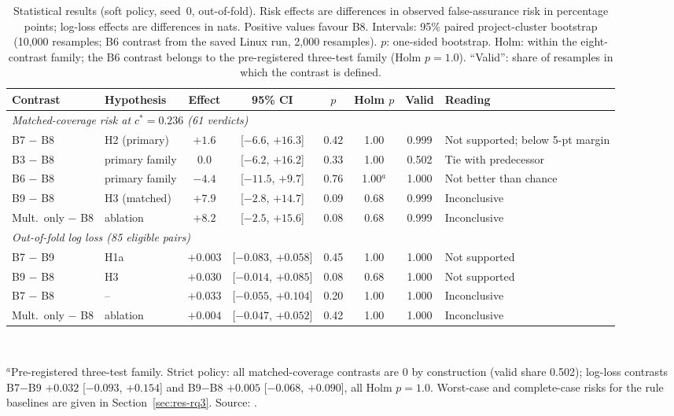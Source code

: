 \begin{table}[!t]
\caption{Statistical results (soft policy, seed~0, out-of-fold). Risk effects are differences in observed false-assurance risk in percentage points; log-loss effects are differences in nats. Positive values favour B8. Intervals: 95\% paired project-cluster bootstrap (10{,}000 resamples; B6 contrast from the saved Linux run, 2{,}000 resamples). $p$: one-sided bootstrap. Holm: within the eight-contrast family; the B6 contrast belongs to the pre-registered three-test family (Holm $p=1.0$). ``Valid'': share of resamples in which the contrast is defined.}
\label{tab:stats}
\centering
\footnotesize
\setlength{\tabcolsep}{4pt}
\begin{tabular}{|l|l|c|c|c|c|c|l|}
\hline
Contrast & Hypothesis & Effect & 95\% CI & $p$ & Holm $p$ & Valid & Reading \\
\hline
\multicolumn{8}{|l|}{\emph{Matched-coverage risk at $c^\ast=0.236$ (61 verdicts)}} \\
B7 $-$ B8 & H2 (primary) & $+1.6$ & [$-6.6$, $+16.3$] & 0.42 & 1.00 & 0.999 & Not supported; below 5-pt margin \\
B3 $-$ B8 & primary family & $0.0$ & [$-6.2$, $+16.2$] & 0.33 & 1.00 & 0.502 & Tie with predecessor \\
B6 $-$ B8 & primary family & $-4.4$ & [$-11.5$, $+9.7$] & 0.76 & 1.00$^{a}$ & 1.000 & Not better than chance \\
B9 $-$ B8 & H3 (matched) & $+7.9$ & [$-2.8$, $+14.7$] & 0.09 & 0.68 & 0.999 & Inconclusive \\
Mult.\ only $-$ B8 & ablation & $+8.2$ & [$-2.5$, $+15.6$] & 0.08 & 0.68 & 0.999 & Inconclusive \\
\hline
\multicolumn{8}{|l|}{\emph{Out-of-fold log loss (85 eligible pairs)}} \\
B7 $-$ B9 & H1a & $+0.003$ & [$-0.083$, $+0.058$] & 0.45 & 1.00 & 1.000 & Not supported \\
B9 $-$ B8 & H3 & $+0.030$ & [$-0.014$, $+0.085$] & 0.08 & 0.68 & 1.000 & Not supported \\
B7 $-$ B8 & -- & $+0.033$ & [$-0.055$, $+0.104$] & 0.20 & 1.00 & 1.000 & Inconclusive \\
Mult.\ only $-$ B8 & ablation & $+0.004$ & [$-0.047$, $+0.052$] & 0.42 & 1.00 & 1.000 & Inconclusive \\
\hline
\end{tabular}
\\[3pt]
\parbox{\textwidth}{\scriptsize $^{a}$Pre-registered three-test family. Strict policy: all matched-coverage contrasts are $0$ by construction (valid share 0.502); log-loss contrasts B7$-$B9 $+0.032$ [$-0.093$, $+0.154$] and B9$-$B8 $+0.005$ [$-0.068$, $+0.090$], all Holm $p=1.0$. Worst-case and complete-case risks for the rule baselines are given in Section~\ref{sec:res-rq3}. Source: .}
\end{table}

